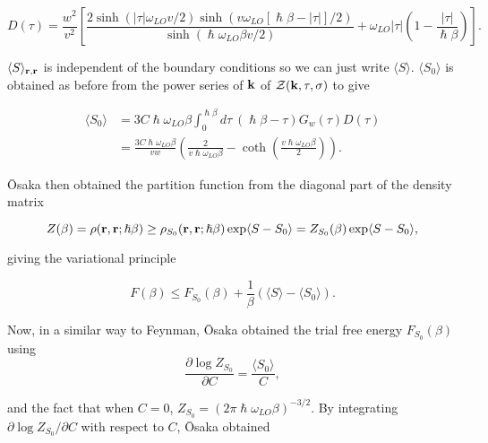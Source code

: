 \begin{equation}
    D(\tau) = \frac{w^2}{v^2} \left[ \frac{2\sinh(|\tau|\omega_{LO} v/2) \sinh(v \omega_{LO}[\hslash\beta - |\tau|] / 2)}{\sinh(\hslash\omega_{LO}\beta v /2)} + \omega_{LO}|\tau| \left(1 - \frac{|\tau|}{\hslash\beta}\right)\right].
\end{equation}

$ \langle S \rangle_{\vb{r}, \vb{r}}$ is independent of the boundary conditions so we can just write $\langle S \rangle$. $\langle S_0 \rangle$ is obtained as before from the power series of $\vb{k}$ of $\mathcal{Z}(\vb{k}, \tau, \sigma)$ to give

\begin{equation}
    \begin{aligned}
        \langle S_0 \rangle &= 3C\hslash\omega_{LO}\beta \int^{\hslash\beta}_0 d\tau\ (\hslash\beta - \tau) G_w(\tau) D(\tau) \\
        &= \frac{3C \hslash \omega_{LO} \beta}{vw} \left(\frac{2}{v\hslash\omega_{LO}\beta} - \coth\left(\frac{v\hslash\omega_{LO}\beta}{2}\right) \right).
    \end{aligned}
\end{equation}

\=Osaka then obtained the partition function from the diagonal part of the density matrix

\begin{equation}
    Z(\beta) = \rho(\vb{r}, \vb{r}; \hslash\beta) \geq \rho_{S_0}(\vb{r}, \vb{r}; \hslash\beta) \exp\langle S - S_0 \rangle = Z_{S_0}(\beta) \exp\langle S - S_0 \rangle,
\end{equation}

giving the variational principle

\begin{equation}\label{eqn:osaka_var}
    F(\beta) \leq F_{S_0}(\beta) + \frac{1}{\beta} \left( \langle S\rangle - \langle S_0 \rangle \right).
\end{equation}

Now, in a similar way to Feynman, \=Osaka obtained the trial free energy $F_{S_0}(\beta)$ using
\begin{equation}
     \frac{\partial \log Z_{S_0}}{\partial C} = \frac{\langle S_0 \rangle}{C},
\end{equation}

and the fact that when $C = 0$, $Z_{S_0} = (2\pi\hslash\omega_{LO}\beta)^{-3/2}$. By integrating $\partial \log Z_{S_0} / \partial C$ with respect to $C$, \=Osaka obtained

